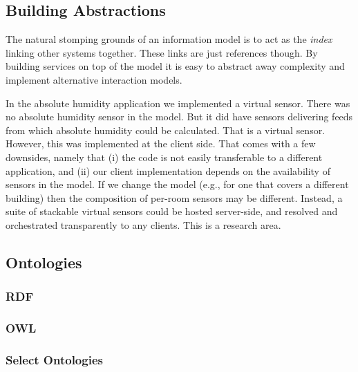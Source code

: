 \subsection{Building Abstractions}

The natural stomping grounds of an information model is to act as the \textsl{index} linking other systems together. These links are just references though. By building services on top of the model it is easy to abstract away complexity and implement alternative interaction models.

In the absolute humidity application we implemented a virtual sensor. There was no absolute humidity sensor in the model. But it did have sensors delivering feeds from which absolute humidity could be calculated. That is a virtual sensor. However, this was implemented at the client side. That comes with a few downsides, namely that (i) the code is not easily transferable to a different application, and (ii) our client implementation depends on the availability of sensors in the model. If we change the model (e.g., for one that covers a different building) then the composition of per-room sensors may be different. Instead, a suite of stackable virtual sensors could be hosted server-side, and resolved and orchestrated transparently to any clients. This is a research area.


\subsection{Ontologies}
\subsubsection{RDF}
\subsubsection{OWL}
\subsubsection{Select Ontologies}

